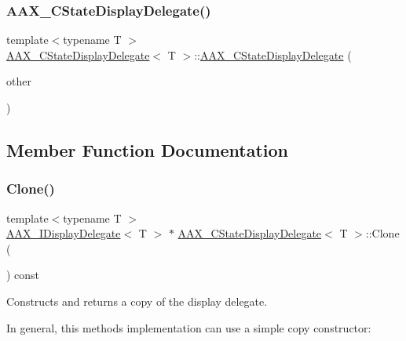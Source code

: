 \subsubsection{\texorpdfstring{AAX\_CStateDisplayDelegate()}{AAX\_CStateDisplayDelegate()}\hspace{0.1cm}{\footnotesize\ttfamily [4/4]}}
{\footnotesize\ttfamily template$<$typename T $>$ \\
\mbox{\hyperlink{a01561}{A\+A\+X\+\_\+\+C\+State\+Display\+Delegate}}$<$ T $>$\+::\mbox{\hyperlink{a01561}{A\+A\+X\+\_\+\+C\+State\+Display\+Delegate}} (\begin{DoxyParamCaption}\item[{const \mbox{\hyperlink{a01561}{A\+A\+X\+\_\+\+C\+State\+Display\+Delegate}}$<$ T $>$ \&}]{other }\end{DoxyParamCaption})}



\subsection{Member Function Documentation}
\mbox{\label{a01561_ad6e328d8784aaccc960da70f51f040a3}} 
\subsubsection{\texorpdfstring{Clone()}{Clone()}}
{\footnotesize\ttfamily template$<$typename T $>$ \\
\mbox{\hyperlink{a01801}{A\+A\+X\+\_\+\+I\+Display\+Delegate}}$<$ T $>$ $\ast$ \mbox{\hyperlink{a01561}{A\+A\+X\+\_\+\+C\+State\+Display\+Delegate}}$<$ T $>$\+::Clone (\begin{DoxyParamCaption}{ }\end{DoxyParamCaption}) const\hspace{0.3cm}{\ttfamily [virtual]}}



Constructs and returns a copy of the display delegate. 

In general, this method\textquotesingle{}s implementation can use a simple copy constructor\+:


\begin{DoxyCode}{0}
\DoxyCodeLine{\textcolor{keyword}{}\{}
\DoxyCodeLine{\}}
\end{DoxyCode}
 

